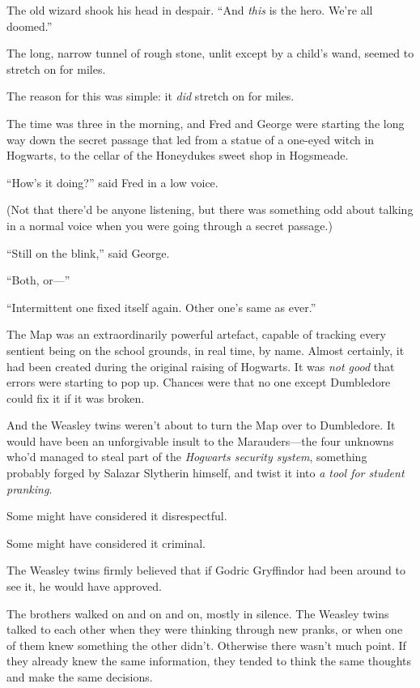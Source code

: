 The old wizard shook his head in despair. “And \emph{this} is the hero. We’re all doomed.”


The long, narrow tunnel of rough stone, unlit except by a child’s wand, seemed to stretch on for miles.

The reason for this was simple: it \emph{did} stretch on for miles.

The time was three in the morning, and Fred and George were starting the long way down the secret passage that led from a statue of a one-eyed witch in Hogwarts, to the cellar of the Honeydukes sweet shop in Hogsmeade.

“How’s it doing?” said Fred in a low voice.

(Not that there’d be anyone listening, but there was something odd about talking in a normal voice when you were going through a secret passage.)

“Still on the blink,” said George.

“Both, or—”

“Intermittent one fixed itself again. Other one’s same as ever.”

The Map was an extraordinarily powerful artefact, capable of tracking every sentient being on the school grounds, in real time, by name. Almost certainly, it had been created during the original raising of Hogwarts. It was \emph{not good} that errors were starting to pop up. Chances were that no one except Dumbledore could fix it if it was broken.

And the Weasley twins weren’t about to turn the Map over to Dumbledore. It would have been an unforgivable insult to the Marauders—the four unknowns who’d managed to steal part of the \emph{Hogwarts security system}, something probably forged by Salazar Slytherin himself, and twist it into \emph{a tool for student pranking}.

Some might have considered it disrespectful.

Some might have considered it criminal.

The Weasley twins firmly believed that if Godric Gryffindor had been around to see it, he would have approved.

The brothers walked on and on and on, mostly in silence. The Weasley twins talked to each other when they were thinking through new pranks, or when one of them knew something the other didn’t. Otherwise there wasn’t much point. If they already knew the same information, they tended to think the same thoughts and make the same decisions.

